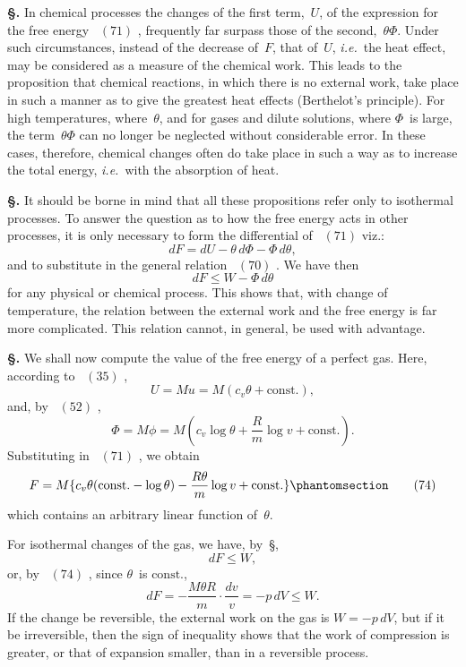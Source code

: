\documentclass[12pt]{book}[2005/09/16]
\newcommand{\Chg}[2]{#2}
\newcommand{\Add}[1]{\Chg{}{#1}}
\newcommand{\Section}[1]{
  \medskip\par\textbf{§\;#1}
  \label{section:#1}
}
\newcommand{\SecRef}[2][§\;]{\hyperref[section:#2.]{{\upshape #1#2}}}
\newcommand{\Tag}[1]{%
  \phantomsection\label{eqn:#1}\tag*{\ensuremath{#1}}%
}
\newcommand{\Eq}[1]{%
  \hyperref[eqn:#1]{\ensuremath{#1}}%
}
\newcommand{\PageSep}[1]{\ignorespaces}
\newcommand{\const}{\text{const.}}
\newcommand{\ie}{\emph{i.e.}}
\begin{document}
\Section{144.} In chemical processes the changes of the first
%
%
term,~$U$, of the expression for the free energy~\Eq{(71)}, frequently
%
%
%
far surpass those of the second,~$\theta\Phi$. Under such
circumstances, instead of the decrease of~$F$, that of~$U$, \ie\
the heat effect, may be considered as a measure of the
chemical work. This leads to the proposition that chemical
reactions, in which there is no external work, take place in
such a manner as to give the greatest heat effects (Berthelot's
principle). For high temperatures, where~$\theta$, and for gases
and dilute solutions, where $\Phi$~is large, the term~$\theta\Phi$ can no
longer be neglected without considerable error. In these
cases, therefore, chemical changes often do take place in
such a way as to increase the total energy, \ie\ with the
absorption of heat.

\Section{145.} It should be borne in mind that all these propositions
refer only to isothermal processes. To answer the
question as to how the free energy acts in other processes,
it is only necessary to form the differential of~\Eq{(71)} viz.:
\[
dF = dU - \theta\, d\Phi - \Phi\, d\theta\Add{,}
\]
and to substitute in the general relation~\Eq{(70)}. We have
then
\[
dF \leq W - \Phi\, d\theta
\]
for any physical or chemical process. This shows that,
with change of temperature, the relation between the
external work and the free energy is far more complicated.
This relation cannot, in general, be used with advantage.

\Section{146.} We shall now compute the value of the free
energy of a perfect gas. Here, according to~\Eq{(35)},
\[
U = Mu = M(c_{v} \theta + \const),
\]
\PageSep{114}
and, by~\Eq{(52)},
\[
\Phi = M\phi = M(c_{v} \log \theta + \frac{R}{m} \log v + \const).
\]
Substituting in~\Eq{(71)}, we obtain
\[
F = M\{c_{v} \theta (\const - \log \theta) - \frac{R\theta}{m} \log v + \const\}
\Tag{(74)}
\]
which contains an arbitrary linear function of~$\theta$.

For isothermal changes of the gas, we have, by~\SecRef{142},
\[
dF \leq W,
\]
or, by~\Eq{(74)}, since $\theta$~is $\const$,
\[
dF = -\frac{M\theta R}{m} · \frac{dv}{v} = -p\, dV \leq W.
\]
If the change be reversible, the external work on the
gas is $W = -p\, dV$, but if it be irreversible, then the
sign of inequality shows that the work of compression is
greater, or that of expansion smaller, than in a reversible
process.
%
\end{document}
